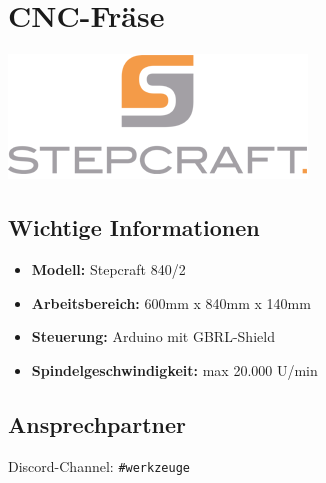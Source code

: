\documentclass{article}
\begin{document}
	
	\noindent
	\begin{minipage}{0.25\textwidth}
		\section*{CNC-Fräse}
	\end{minipage}
	\hfill
	\begin{minipage}{0.2\textwidth}
		\includegraphics[width=\textwidth]{sc-logo.png}
	\end{minipage}
	\hspace{2em}	
	\begin{minipage}{0.1\textwidth}
				
	\end{minipage}%
	
	\subsection*{Wichtige Informationen}
	\begin{itemize}
		\item \textbf{Modell:} Stepcraft 840/2
		\item \textbf{Arbeitsbereich:} 600mm x 840mm x 140mm
		\item \textbf{Steuerung:} Arduino mit GBRL-Shield
		\item \textbf{Spindelgeschwindigkeit:} max 20.000 U/min
	\end{itemize}
	
		\noindent\dotfill
	\subsection*{Ansprechpartner}
	Discord-Channel: \colorbox{gray!30}{\texttt{\#werkzeuge}}
	\vspace{1em}\\
	
	\noindent\dotfill
\end{document}
